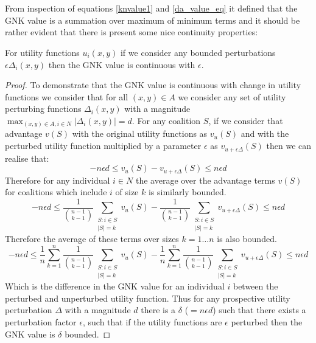 


\DIFdelbegin \section{}%
\addtocounter{section}{-1}%
\DIFdelend \DIFaddbegin \chapter{}\DIFaddend \label{appendix:continuity_of_GNK}

From inspection of equations \ref{knvalue1} and \ref{da_value_eq} it defined that the GNK value is a summation over maximum of minimum terms and it should be rather evident that there is present some nice continuity properties:

\begin{theorem}
For utility functions $u_i(x,y)$ if we consider any bounded perturbations $\epsilon \Delta_i(x,y)$ then the GNK value is continuous with $\epsilon$.
\end{theorem}
\begin{proof}
To demonstrate that the GNK value is continuous with change in utility functions we consider that for all $(x,y)\in A$ we consider any set of utility perturbing functions $\Delta_i(x,y)$ with a magnitude $\max_{(x,y)\in A, i\in N}|\Delta_i(x,y)| = d$.
For any coalition $S$, if we consider that advantage $v(S)$ with the original utility functions as $v_u(S)$ and with the perturbed utility function multiplied by a parameter $\epsilon$ as $v_{u+\epsilon \Delta}(S)$ then we can realise that:
$$-n\epsilon d \le v_u(S)-v_{u+\epsilon \Delta}(S) \le n\epsilon d$$
Therefore for any individual $i\in N$ the average over the advantage terms $v(S)$ for coalitions which include $i$ of size $k$ is similarly bounded.
$$-n\epsilon d \le \frac{1}{\binom{n-1}{k-1}} \sum_{\substack{S:i\in S \\ |S|=k}}v_u(S)-\frac{1}{\binom{n-1}{k-1}} \sum_{\substack{S:i\in S \\ |S|=k}}v_{u+\epsilon \Delta}(S) \le n\epsilon d$$
Therefore the average of these terms over sizes $k=1\dots n$ is also bounded.
$$-n\epsilon d \le \frac{1}{n}\sum_{k=1}^n \frac{1}{\binom{n-1}{k-1}} \sum_{\substack{S:i\in S \\ |S|=k}}v_u(S)-\frac{1}{n}\sum_{k=1}^n \frac{1}{\binom{n-1}{k-1}} \sum_{\substack{S:i\in S \\ |S|=k}}v_{u+\epsilon \Delta}(S) \le n\epsilon d$$
Which is the difference in the GNK value for an individual $i$ between the perturbed and unperturbed utility function.
Thus for any prospective utility perturbation $\Delta$ with a magnitude $d$ there is a $\delta$ ($=n\epsilon d$) such that there exists a perturbation factor $\epsilon$, such that if the utility functions are $\epsilon$ perturbed then the GNK value is $\delta$ bounded.
\end{proof}

